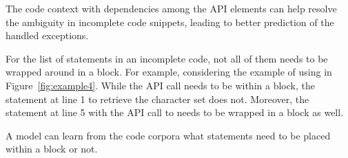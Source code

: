 

\begin{Observation} 
\label{ob4}
The code context with dependencies among the API elements can help resolve
the ambiguity
in incomplete code snippets, leading to better prediction of the
handled exceptions.
\end{Observation}


For the list of statements in an incomplete code, not all of them
needs to be wrapped around in a  block. For example,
considering the example of using  in
Figure~\ref{fig:example4}. While the API call
 needs to be within a
 block, the statement at line 1 to retrieve the
character set does not. Moreover, the statement at line 5 with the API
call to  needs to be wrapped in a 
block as well.






\begin{Observation} 
\label{ob5}
  A model can learn from the code corpora what statements need to be placed
  within a  block or not.
\end{Observation}
